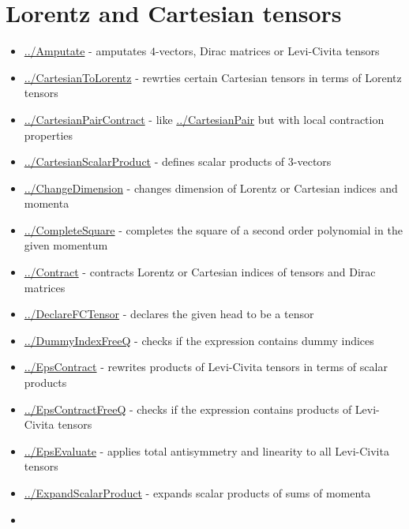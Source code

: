 \documentclass[../FeynCalcManual.tex]{subfiles}
\begin{document}
\hypertarget{lorentz and cartesian tensors}{
\section{Lorentz and Cartesian tensors}\label{lorentz and cartesian tensors}}

\begin{itemize}
\tightlist
\item
  \hyperlink{../amputate}{../Amputate} - amputates \(4\)-vectors, Dirac
  matrices or Levi-Civita tensors
\item
  \hyperlink{../cartesiantolorentz}{../CartesianToLorentz} - rewrties
  certain Cartesian tensors in terms of Lorentz tensors
\item
  \hyperlink{../cartesianpaircontract}{../CartesianPairContract} - like
  \hyperlink{../cartesianpair}{../CartesianPair} but with local
  contraction properties
\item
  \hyperlink{../cartesianscalarproduct}{../CartesianScalarProduct} -
  defines scalar products of \(3\)-vectors
\item
  \hyperlink{../changedimension}{../ChangeDimension} - changes dimension
  of Lorentz or Cartesian indices and momenta
\item
  \hyperlink{../completesquare}{../CompleteSquare} - completes the
  square of a second order polynomial in the given momentum
\item
  \hyperlink{../contract}{../Contract} - contracts Lorentz or Cartesian
  indices of tensors and Dirac matrices
\item
  \hyperlink{../declarefctensor}{../DeclareFCTensor} - declares the
  given head to be a tensor
\item
  \hyperlink{../dummyindexfreeq}{../DummyIndexFreeQ} - checks if the
  expression contains dummy indices
\item
  \hyperlink{../epscontract}{../EpsContract} - rewrites products of
  Levi-Civita tensors in terms of scalar products
\item
  \hyperlink{../epscontractfreeq}{../EpsContractFreeQ} - checks if the
  expression contains products of Levi-Civita tensors
\item
  \hyperlink{../epsevaluate}{../EpsEvaluate} - applies total
  antisymmetry and linearity to all Levi-Civita tensors
\item
  \hyperlink{../expandscalarproduct}{../ExpandScalarProduct} - expands
  scalar products of sums of momenta
\item

\end{itemize}
\end{document}
